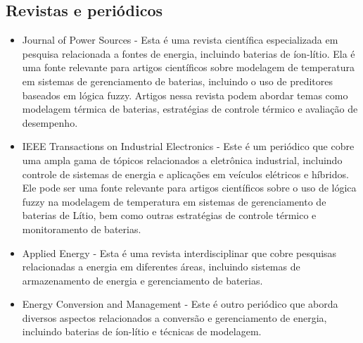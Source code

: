 \subsection{Revistas e periódicos}
\begin{itemize}
    \item Journal of Power Sources - Esta é uma revista científica especializada em pesquisa relacionada a fontes de energia, incluindo baterias de íon-lítio. Ela é uma fonte relevante para artigos científicos sobre modelagem de temperatura em sistemas de gerenciamento de baterias, incluindo o uso de preditores baseados em lógica fuzzy. Artigos nessa revista podem abordar temas como modelagem térmica de baterias, estratégias de controle térmico e avaliação de desempenho.

    \item IEEE Transactions on Industrial Electronics - Este é um periódico que cobre uma ampla gama de tópicos relacionados a eletrônica industrial, incluindo controle de sistemas de energia e aplicações em veículos elétricos e híbridos. Ele pode ser uma fonte relevante para artigos científicos sobre o uso de lógica fuzzy na modelagem de temperatura em sistemas de gerenciamento de baterias de Lítio, bem como outras estratégias de controle térmico e monitoramento de baterias.

    \item Applied Energy - Esta é uma revista interdisciplinar que cobre pesquisas relacionadas a energia em diferentes áreas, incluindo sistemas de armazenamento de energia e gerenciamento de baterias.

    \item Energy Conversion and Management - Este é outro periódico que aborda diversos aspectos relacionados a conversão e gerenciamento de energia, incluindo baterias de íon-lítio e técnicas de modelagem.
\end{itemize}

